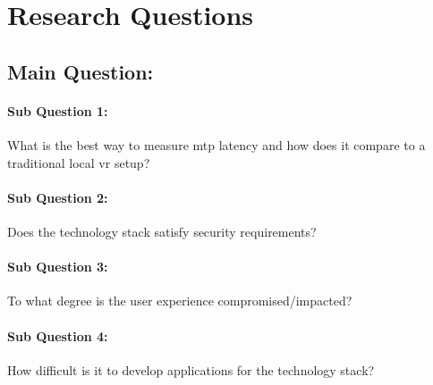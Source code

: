 \section{Research Questions}

\subsection*{Main Question:} 
\paragraph{Sub Question 1:} What is the best way to measure \acrshort{mtp} latency and how does it compare to a traditional local \acrshort{vr} setup?
\paragraph{Sub Question 2:} Does the technology stack satisfy security requirements?
\paragraph{Sub Question 3:} To what degree is the user experience compromised/impacted?
\paragraph{Sub Question 4:} How difficult is it to develop applications for the technology stack?